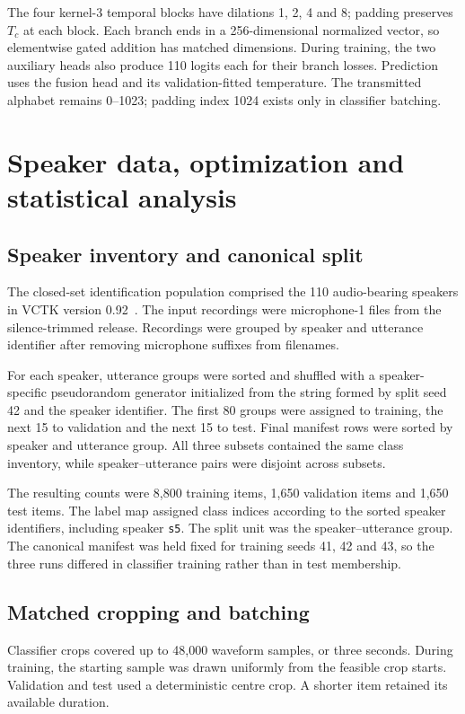 The four kernel-3 temporal blocks have dilations 1, 2, 4 and 8; padding preserves $T_c$ at each block. Each branch ends in a 256-dimensional normalized vector, so elementwise gated addition has matched dimensions. During training, the two auxiliary heads also produce 110 logits each for their branch losses. Prediction uses the fusion head and its validation-fitted temperature. The transmitted alphabet remains 0--1023; padding index 1024 exists only in classifier batching.

\section{Speaker data, optimization and statistical analysis}
\label{sec:sv2-speaker-protocol}

\subsection{Speaker inventory and canonical split}
The closed-set identification population comprised the 110 audio-bearing speakers in VCTK version 0.92~\cite{vctk}. The input recordings were microphone-1 files from the silence-trimmed release. Recordings were grouped by speaker and utterance identifier after removing microphone suffixes from filenames.

For each speaker, utterance groups were sorted and shuffled with a speaker-specific pseudorandom generator initialized from the string formed by split seed 42 and the speaker identifier. The first 80 groups were assigned to training, the next 15 to validation and the next 15 to test. Final manifest rows were sorted by speaker and utterance group. All three subsets contained the same class inventory, while speaker--utterance pairs were disjoint across subsets.

The resulting counts were 8,800 training items, 1,650 validation items and 1,650 test items. The label map assigned class indices according to the sorted speaker identifiers, including speaker \texttt{s5}. The split unit was the speaker--utterance group. The canonical manifest was held fixed for training seeds 41, 42 and 43, so the three runs differed in classifier training rather than in test membership.

\subsection{Matched cropping and batching}
Classifier crops covered up to 48,000 waveform samples, or three seconds. During training, the starting sample was drawn uniformly from the feasible crop starts. Validation and test used a deterministic centre crop. A shorter item retained its available duration.

